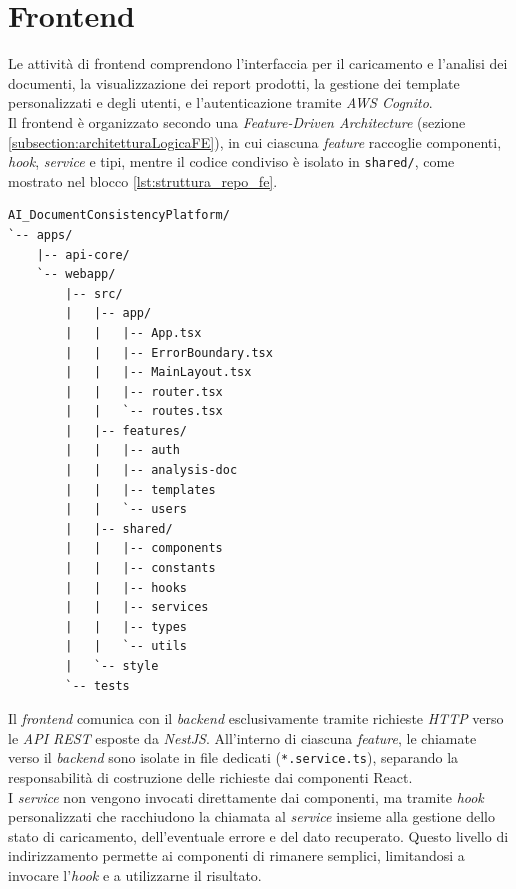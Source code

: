 \section{Frontend}
Le attività di frontend comprendono l'interfaccia per il caricamento e l'analisi dei documenti, la visualizzazione dei report prodotti, la gestione dei template personalizzati e degli utenti, e l'autenticazione tramite \emph{AWS Cognito}.\\

Il frontend è organizzato secondo una \emph{Feature-Driven Architecture} (sezione \ref{subsection:architetturaLogicaFE}), in cui ciascuna \emph{feature} raccoglie componenti, \emph{hook}, \emph{service} e tipi, mentre il codice condiviso è isolato in \texttt{shared/}, come mostrato nel blocco \ref{lst:struttura_repo_fe}.

\begin{lstlisting}[label={lst:struttura_repo_fe}]
AI_DocumentConsistencyPlatform/
`-- apps/
    |-- api-core/
    `-- webapp/
        |-- src/
        |   |-- app/
        |   |   |-- App.tsx
        |   |   |-- ErrorBoundary.tsx
        |   |   |-- MainLayout.tsx
        |   |   |-- router.tsx
        |   |   `-- routes.tsx
        |   |-- features/
        |   |   |-- auth
        |   |   |-- analysis-doc
        |   |   |-- templates
        |   |   `-- users
        |   |-- shared/
        |   |   |-- components
        |   |   |-- constants
        |   |   |-- hooks
        |   |   |-- services
        |   |   |-- types
        |   |   `-- utils
        |   `-- style
        `-- tests
\end{lstlisting}

Il \emph{frontend} comunica con il \emph{backend} esclusivamente tramite richieste \emph{HTTP} verso le \emph{API REST} esposte da \emph{NestJS}. All'interno di ciascuna \emph{feature}, le chiamate verso il \emph{backend} sono isolate in file dedicati (\texttt{*.service.ts}), separando la responsabilità di costruzione delle richieste dai componenti React.\\

I \emph{service} non vengono invocati direttamente dai componenti, ma tramite \emph{hook} personalizzati che racchiudono la chiamata al \emph{service} insieme alla gestione dello stato di caricamento, dell'eventuale errore e del dato recuperato. Questo livello di indirizzamento permette ai componenti di rimanere semplici, limitandosi a invocare l'\emph{hook} e a utilizzarne il risultato.\\

